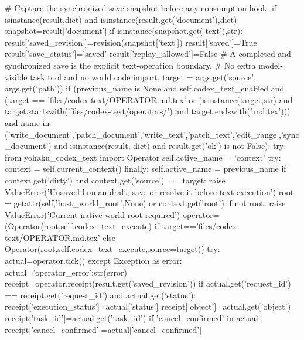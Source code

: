             # Capture the synchronized save snapshot before any consumption hook.
            if isinstance(result,dict) and isinstance(result.get('document'),dict):
                snapshot=result['document']
                if isinstance(snapshot.get('text'),str):
                    result['saved_revision']=revision(snapshot['text'])
                    result['saved']=True
                    result['save_status']='saved'
                    result['replay_allowed']=False
            # A completed and synchronized save is the explicit text-operation boundary.
            # No extra model-visible task tool and no world code import.
            target = args.get('source', args.get('path'))
            if (previous_name is None and self.codex_text_enabled and (target == 'files/codex-text/OPERATOR.md.tex' or (isinstance(target,str) and target.startswith('files/codex-text/operators/') and target.endswith('.md.tex')))
                    and name in ('write_document','patch_document','write_text','patch_text','edit_range','sync_document')
                    and isinstance(result, dict) and result.get('ok') is not False):
                try:
                    from yohaku_codex_text import Operator
                    self.active_name = 'context'
                    try: context = self.current_context()
                    finally: self.active_name = previous_name
                    if context.get('dirty') and context.get('source') == target:
                        raise ValueError('Unsaved human draft; save or resolve it before text execution')
                    root = getattr(self,'host_world_root',None) or context.get('root')
                    if not root: raise ValueError('Current native world root required')
                    operator=(Operator(root,self.codex_text_execute) if target=='files/codex-text/OPERATOR.md.tex' else Operator(root,self.codex_text_execute,source=target))
                    try:
                        actual=operator.tick()
                    except Exception as error:
                        actual={'operator_error':str(error)}
                    receipt=operator.receipt(result.get('saved_revision'))
                    if actual.get('request_id') == receipt.get('request_id') and actual.get('status'):
                        receipt['execution_status']=actual['status']
                        receipt['object']=actual.get('object')
                        receipt['task_id']=actual.get('task_id')
                        if 'cancel_confirmed' in actual:
                            receipt['cancel_confirmed']=actual['cancel_confirmed']
